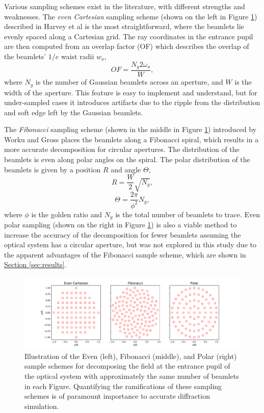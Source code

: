 Various sampling schemes exist in the literature, with different strengths and weaknesses. The \emph{even Cartesian} sampling scheme (shown on the left in Figure \ref{fig:sampleschemes}) described in Harvey et al\cite{Harvey15} is the most straightforward, where the beamlets lie evenly spaced along a Cartesian grid. The ray coordinates in the entrance pupil are then computed from an overlap factor (OF) which describes the overlap of the beamlets' $1/e$ waist radii $w_o$,
\begin{equation}
    OF = \frac{N_{g} 2 \omega_{o}}{W},
\end{equation}
where $N_{g}$ is the number of Gaussian beamlets across an aperture, and $W$ is the width of the aperture. This feature is easy to implement and understand, but for under-sampled cases it introduces artifacts due to the ripple from the distribution and soft edge left by the Gaussian beamlets. 

The \emph{Fibonacci} sampling scheme (shown in the middle in Figure \ref{fig:sampleschemes}) introduced by Worku and Gross places the beamlets along a Fibonacci spiral, which results in a more accurate decomposition for circular apertures\cite{Worku:18}. The distribution of the beamlets is even along polar angles on the spiral. The polar distribution of the beamlets is given by a position $R$ and angle $\Theta$,
\begin{equation}
    R = \frac{W}{2}\sqrt{N_{g}},
\end{equation}
\begin{equation}
    \Theta = \frac{2\pi}{\phi^{2}}N_{g},
\end{equation}
where $\phi$ is the golden ratio and $N_{g}$ is the total number of beamlets to trace. Even polar sampling (shown on the right in Figure \ref{fig:sampleschemes}) is also a viable method to increase the accuracy of the decomposition for fewer beamlets assuming the optical system has a circular aperture\cite{Worku:18}, but was not explored in this study due to the apparent advantages of the Fibonacci sample scheme, which are shown in \hyperref[sec:results]{Section \ref{sec:results}}.

\begin{figure}[H]
    \centering
    \includegraphics[width=\textwidth]{sampleschemes.pdf}
    \caption{Illustration of the Even (left), Fibonacci (middle), and Polar (right) sample schemes for decomposing the field at the entrance pupil of the optical system with approximately the same number of beamlets in each Figure. Quantifying the ramifications of these sampling schemes is of paramount importance to accurate diffraction simulation.}
    \label{fig:sampleschemes}
\end{figure}

